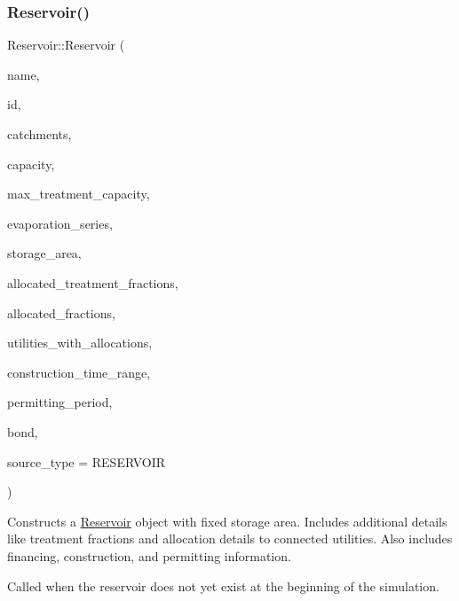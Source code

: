 \subsubsection{\texorpdfstring{Reservoir()}{Reservoir()}\hspace{0.1cm}{\footnotesize\ttfamily [8/9]}}
{\footnotesize\ttfamily Reservoir\+::\+Reservoir (\begin{DoxyParamCaption}\item[{const char $\ast$}]{name,  }\item[{const int}]{id,  }\item[{const vector$<$ \mbox{\hyperlink{classCatchment}{Catchment}} $\ast$$>$ \&}]{catchments,  }\item[{const double}]{capacity,  }\item[{const double}]{max\+\_\+treatment\+\_\+capacity,  }\item[{Evaporation\+Series \&}]{evaporation\+\_\+series,  }\item[{double}]{storage\+\_\+area,  }\item[{vector$<$ double $>$ $\ast$}]{allocated\+\_\+treatment\+\_\+fractions,  }\item[{vector$<$ double $>$ $\ast$}]{allocated\+\_\+fractions,  }\item[{vector$<$ int $>$ $\ast$}]{utilities\+\_\+with\+\_\+allocations,  }\item[{const vector$<$ double $>$ \&}]{construction\+\_\+time\+\_\+range,  }\item[{double}]{permitting\+\_\+period,  }\item[{\mbox{\hyperlink{classBond}{Bond}} \&}]{bond,  }\item[{int}]{source\+\_\+type = {\ttfamily RESERVOIR} }\end{DoxyParamCaption})}



Constructs a \mbox{\hyperlink{classReservoir}{Reservoir}} object with fixed storage area. Includes additional details like treatment fractions and allocation details to connected utilities. Also includes financing, construction, and permitting information. 

Called when the reservoir does not yet exist at the beginning of the simulation.



